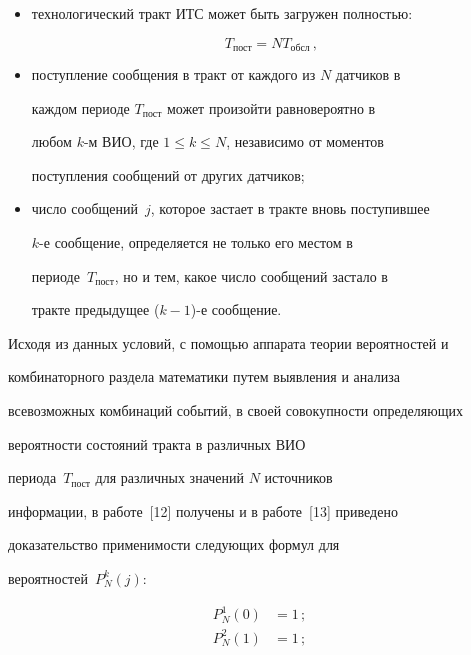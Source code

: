         \begin{itemize}


\item[(а)] технологический тракт ИТС может быть загружен полностью: 


\begin{equation}


T_{\mathrm{пост}} = N T_{\mathrm{обсл}}\,,


\label{e7-2-2}


\end{equation}


\item[(б)] поступление сообщения в тракт от каждого из $N$ датчиков в 


каждом периоде $T_{\mathrm{пост}}$ может произойти равновероятно в 


любом $k$-м ВИО, где $1\leq k\leq N$, независимо от моментов 


поступления сообщений от других датчиков;


\item[(в)] число сообщений~$j$, которое застает в тракте вновь поступившее 


$k$-е сообщение, определяется не только его местом в 


периоде~$T_{\mathrm{пост}}$, но и тем, какое число сообщений застало в 


тракте предыдущее ($k-1$)-е сообщение.


\end{itemize}





Исходя из данных условий, с помощью аппарата теории вероятностей и 


комбинаторного раздела математики путем выявления и анализа 


всевозможных комбинаций событий, в своей совокупности определяющих 


вероятности состояний тракта в различных ВИО 


периода~$T_{\mathrm{пост}}$ для различных значений $N$ источников 


информации, в работе~[12] получены и в работе~[13] приведено 


доказательство применимости следующих формул для 


вероятностей~$P^k_N(j)$:


\begin{align}


P^1_N(0)&=1\,;\label{e8-2-2}\\


P^2_N(1)&=1\,;\label{e9-2-2}


\end{align}





